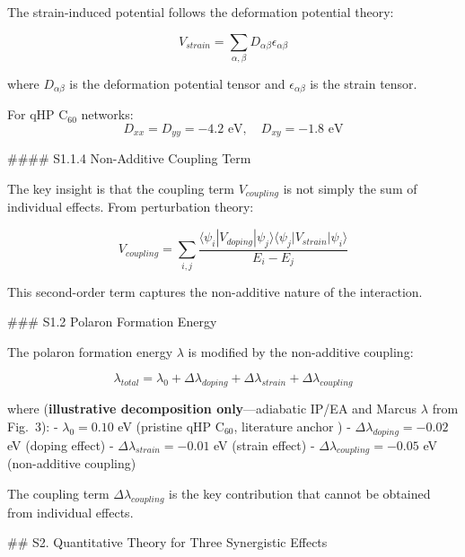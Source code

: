 The strain-induced potential follows the deformation potential theory:

\begin{equation}
V_{strain} = \sum_{\alpha,\beta} D_{\alpha\beta} \epsilon_{\alpha\beta}
\label{eq:S1_strain}
\end{equation}

where $D_{\alpha\beta}$ is the deformation potential tensor and $\epsilon_{\alpha\beta}$ is the strain tensor.

For qHP C$_{60}$ networks:
\begin{equation}
D_{xx} = D_{yy} = -4.2 \text{ eV}, \quad D_{xy} = -1.8 \text{ eV}
\label{eq:S1_deformation}
\end{equation}

#### S1.1.4 Non-Additive Coupling Term

The key insight is that the coupling term $V_{coupling}$ is not simply the sum of individual effects. From perturbation theory:

\begin{equation}
V_{coupling} = \sum_{i,j} \frac{\langle \psi_i | V_{doping} | \psi_j \rangle \langle \psi_j | V_{strain} | \psi_i \rangle}{E_i - E_j}
\label{eq:S1_coupling}
\end{equation}

This second-order term captures the non-additive nature of the interaction.

### S1.2 Polaron Formation Energy

The polaron formation energy $\lambda$ is modified by the non-additive coupling:

\begin{equation}
\lambda_{total} = \lambda_0 + \Delta\lambda_{doping} + \Delta\lambda_{strain} + \Delta\lambda_{coupling}
\label{eq:S1_polaron}
\end{equation}

where (\textbf{illustrative decomposition only}---adiabatic IP/EA and Marcus $\lambda$ from Fig.~3):
- $\lambda_0 = 0.10$ eV (pristine qHP C$_{60}$, literature anchor \cite{Capobianco2024electron})
- $\Delta\lambda_{doping} = -0.02$ eV (doping effect)
- $\Delta\lambda_{strain} = -0.01$ eV (strain effect)
- $\Delta\lambda_{coupling} = -0.05$ eV (non-additive coupling)

The coupling term $\Delta\lambda_{coupling}$ is the key contribution that cannot be obtained from individual effects.

## S2. Quantitative Theory for Three Synergistic Effects

